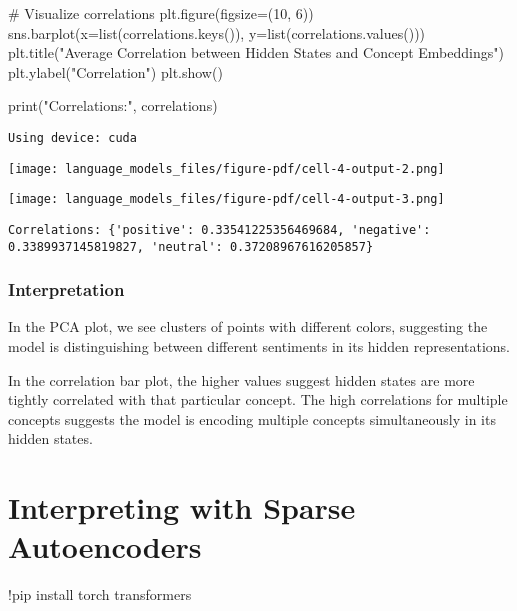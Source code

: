 \documentclass[
  letterpaper,
  DIV=11,
  numbers=noendperiod]{scrreprt}
\newenvironment{Shaded}{\begin{snugshade}}{\end{snugshade}}
\newcommand{\BuiltInTok}[1]{\textcolor[rgb]{0.00,0.23,0.31}{#1}}
\newcommand{\CommentTok}[1]{\textcolor[rgb]{0.37,0.37,0.37}{#1}}
\newcommand{\DecValTok}[1]{\textcolor[rgb]{0.68,0.00,0.00}{#1}}
\newcommand{\NormalTok}[1]{\textcolor[rgb]{0.00,0.23,0.31}{#1}}
\newcommand{\OperatorTok}[1]{\textcolor[rgb]{0.37,0.37,0.37}{#1}}
\newcommand{\StringTok}[1]{\textcolor[rgb]{0.13,0.47,0.30}{#1}}
\begin{document}
\begin{Shaded}
\begin{Highlighting}[]
\CommentTok{\# Visualize correlations}
\NormalTok{plt.figure(figsize}\OperatorTok{=}\NormalTok{(}\DecValTok{10}\NormalTok{, }\DecValTok{6}\NormalTok{))}
\NormalTok{sns.barplot(x}\OperatorTok{=}\BuiltInTok{list}\NormalTok{(correlations.keys()), y}\OperatorTok{=}\BuiltInTok{list}\NormalTok{(correlations.values()))}
\NormalTok{plt.title(}\StringTok{"Average Correlation between Hidden States and Concept Embeddings"}\NormalTok{)}
\NormalTok{plt.ylabel(}\StringTok{"Correlation"}\NormalTok{)}
\NormalTok{plt.show()}

\BuiltInTok{print}\NormalTok{(}\StringTok{"Correlations:"}\NormalTok{, correlations)}
\end{Highlighting}
\end{Shaded}

\begin{verbatim}
Using device: cuda
\end{verbatim}

\texttt{[image: language\_models\_files/figure-pdf/cell-4-output-2.png]}

\texttt{[image: language\_models\_files/figure-pdf/cell-4-output-3.png]}

\begin{verbatim}
Correlations: {'positive': 0.33541225356469684, 'negative': 0.3389937145819827, 'neutral': 0.37208967616205857}
\end{verbatim}

\subsection{Interpretation}\label{interpretation-3}

In the PCA plot, we see clusters of points with different colors,
suggesting the model is distinguishing between different sentiments in
its hidden representations.

In the correlation bar plot, the higher values suggest hidden states are
more tightly correlated with that particular concept. The high
correlations for multiple concepts suggests the model is encoding
multiple concepts simultaneously in its hidden states.


\chapter{Interpreting with Sparse
Autoencoders}\label{interpreting-with-sparse-autoencoders}

\begin{Shaded}
\begin{Highlighting}[]
\OperatorTok{!}\NormalTok{pip install torch transformers}
\end{Highlighting}
\end{Shaded}
\end{document}
